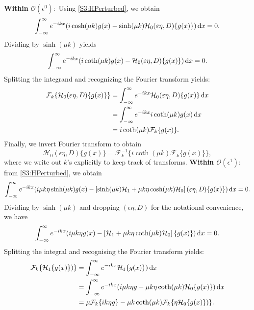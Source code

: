 \textbf{Within $\mathcal{O}(\epsilon^0):$} Using \eqref{S3:HPerturbed}, we obtain 
\begin{equation*}
\int_{-\infty}^{\infty} e^{-ikx}( i  \cosh(\mu k) g(x) - \sinh(\mu k) \mathcal{H}_0( \varepsilon \eta, D)\{ g(x) \}) \,\mathrm{d} x = 0.
\end{equation*}
Dividing by $\sinh(\mu k)$ yields 
\begin{equation*}
\int_{-\infty}^{\infty} e^{-ikx}( i  \coth(\mu k) g(x) - \mathcal{H}_0( \varepsilon \eta, D)\{ g(x) \}) \,\mathrm{d} x = 0.
\end{equation*}
Splitting the integrand and recognizing the Fourier transform yields:
\begin{align*}
\mathcal{F}_k\{\mathcal{H}_0( \varepsilon \eta, D)\{ g(x) \}\}&= \int_{-\infty}^{\infty} e^{-ikx}\mathcal{H}_0( \varepsilon \eta, D)\{ g(x) \} \,\mathrm{d} x\\
&= \int_{-\infty}^{\infty} e^{-ikx} i \coth(\mu k) g(x) \,\mathrm{d} x \\
&= i \coth(\mu k) \mathcal{F}_k\{g(x)\}.
\end{align*}
Finally, we invert Fourier transform to obtain 
\begin{equation}\label{S3:H0}
\mathcal{H}_0( \epsilon \eta, D)\{ g(x) \} =\mathcal{F}^{-1}_k\{i \coth(\mu k) \mathcal{F}_k\{g(x)\} \},
\end{equation}
where we write out $k$'s explicitly to keep track of transforms. 
\newline \textbf{Within $\mathcal{O}(\epsilon^1):$} from \eqref{S3:HPerturbed}, we obtain
\begin{align*}
\int_{-\infty}^{\infty} e^{-ikx}( i \mu k \eta \sinh(\mu k) g(x) - \left[ \sinh(\mu k)\mathcal{H}_1 + \mu k \eta \cosh(\mu k) \mathcal{H}_0 \right]( \varepsilon \eta, D)\{ g(x) \}) \,\mathrm{d} x = 0.
\end{align*}
Dividing by $\sinh(\mu k)$ and dropping $( \epsilon \eta, D)$ for the notational convenience, we have 
\begin{align*}
\int_{-\infty}^{\infty} e^{-ikx}( i \mu k \eta g(x) - \left[\mathcal{H}_1 + \mu k \eta \coth(\mu k) \mathcal{H}_0 \right]\{ g(x) \}) \,\mathrm{d} x = 0.
\end{align*}
Splitting the integral and recognising the Fourier transform yields:
\begin{align*}
\mathcal{F}_k \{\mathcal{H}_1 \{ g(x) \})\} &= \int_{-\infty}^{\infty} e^{-ikx}  \mathcal{H}_1 \{ g(x) \}) \,\mathrm{d} x \\
&= \int_{-\infty}^{\infty} e^{-ikx}( i \mu k \eta g  - \mu k \eta \coth(\mu k) \mathcal{H}_0 \{ g(x) \}) \,\mathrm{d} x \\
&= \mu \mathcal{F}_k \{ i k \eta g \} - \mu k \coth(\mu k) \mathcal{F}_k\{ \eta \mathcal{H}_0 \{ g(x) \}) \}.
\end{align*}
